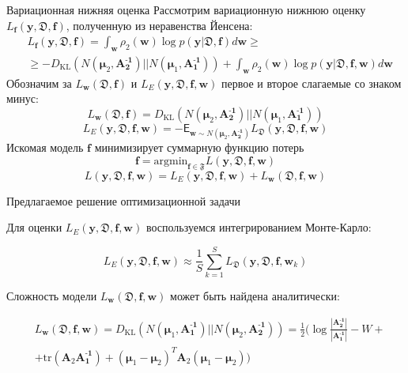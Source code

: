 \documentclass{beamer}
\newcommand{\PP}{p}
\newcommand{\DD}{{\mathfrak{D}}}
\newcommand{\FFF}{{\mathfrak{F}}}
\newcommand{\bw}{{\textbf{w}}}
\newcommand{\bbf}{{\textbf{f}}}
\newcommand{\by}{{\textbf{y}}}
\newcommand{\bAo}{\mathbf{A^\text{-1}_\text{1}}}
\newcommand{\bAt}{\mathbf{A^\text{-1}_\text{2}}}
\newcommand{\bmuo}{{\boldsymbol{\mu}_1}}
\newcommand{\bmut}{{\boldsymbol{\mu}_2}}
\newcommand{\DKL}{\mathit{D}_{\text{KL}}}
\begin{document}
\begin{frame}{Вариационная нижняя оценка}
Рассмотрим вариационную нижнюю оценку $L_\bbf(\by,\DD,\bbf)$, полученную из неравенства Йенсена:
\begin{align*}
&L_\bbf(\by,\DD,\bbf)= \int_{\bw}\rho_2(\bw)\log\PP(\by|\DD,\bbf)d\bw \geq\\&\geq-\DKL(N(\bmut,\bAt)||N(\bmuo,\bAo))+ \int_{\bw}\rho_2(\bw)\log\PP(\by|\DD,\bbf,\bw)d\bw
\end{align*}
Обозначим за $L_\bw(\DD,\bbf)$ и $L_E(\by,\DD,\bbf,\bw)$ первое и второе слагаемые со знаком минус:
$$L_\bw(\DD,\bbf) = \DKL(N(\bmut,\bAt)||N(\bmuo,\bAo))$$
$$L_E(\by,\DD,\bbf,\bw) = -\mathsf{E}_{\bw\sim N(\bmut,\bAt)}L_\DD(\by,\DD, \bbf,\bw)$$
Искомая модель $\bbf$ минимизирует суммарную функцию потерь
$$\bbf = \text{argmin}_{\bbf \in \FFF}L(\by,\DD,\bbf,\bw)$$%
$$L(\by,\DD,\bbf,\bw) = L_E(\by,\DD,\bbf,\bw) + L_\bw(\DD,\bbf,\bw)$$

\end{frame}

%	
%

\begin{frame}{Предлагаемое решение оптимизационной задачи}

Для оценки $L_E(\by,\DD,\bbf,\bw)$ воспользуемся интегрированием Монте-Карло:

$$L_E(\by,\DD,\bbf,\bw) \approx \frac1S\sum\limits_{k=1}^S L_\DD(\by,\DD, \bbf,\bw_k)$$

Сложность модели $L_\bw(\DD,\bbf,\bw)$ может быть найдена аналитически:

\begin{align*}
&L_\bw(\DD,\bbf,\bw) = \DKL(N(\bmuo,\bAo)||N(\bmut,\bAt)) = \frac12 \big( \log \frac{|\bAt|}{|\bAo|}-W+\\
&+\text{tr}(\textbf{A}_2\bAo)+(\bmuo-\bmut)^T\textbf{A}_2(\bmuo-\bmut) \big) 
\end{align*}

\end{frame}
\end{document}
